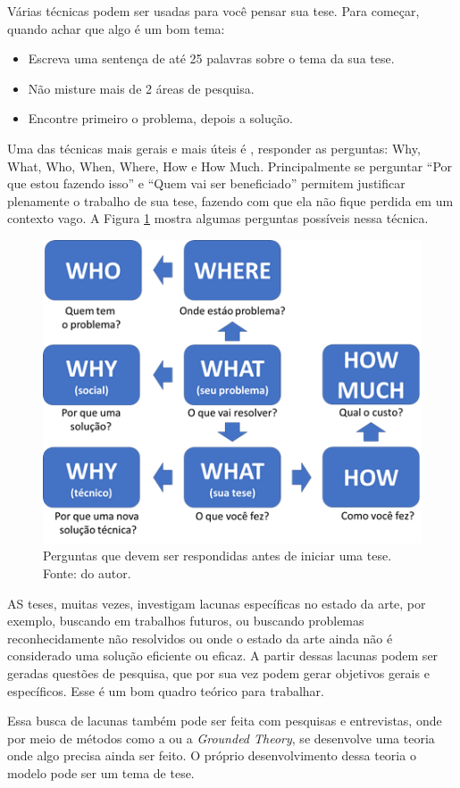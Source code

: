 Várias técnicas podem ser usadas para você pensar sua tese.
Para começar, quando achar que algo é um bom tema:
\begin{itemize}
    \item Escreva uma sentença de até 25 palavras sobre o tema da sua tese.
    \item Não misture mais de 2 áreas de pesquisa.
    \item Encontre primeiro o problema, depois a solução.
\end{itemize}

 Uma das técnicas mais gerais e mais úteis é , responder as perguntas: Why, What, Who, When, Where, How e How Much. 
Principalmente se perguntar “Por que estou fazendo isso” e “Quem vai ser beneficiado” permitem justificar plenamente o trabalho de sua tese, fazendo com que ela não fique perdida em um contexto vago. 
A Figura \ref{fig:5w2h} mostra algumas perguntas possíveis nessa técnica.

\begin{figure}[hbt]
    \centering
    \includegraphics[width=0.7\linewidth]{Images/5w2h}
    \caption{Perguntas que devem ser respondidas antes de iniciar uma tese. Fonte: do autor.}
    \label{fig:5w2h}
\end{figure}

AS teses, muitas vezes, investigam lacunas específicas no estado da arte, por exemplo, buscando em trabalhos futuros, ou buscando problemas reconhecidamente não resolvidos ou onde o estado da arte ainda não é considerado uma solução eficiente ou eficaz. 
A partir dessas lacunas podem ser geradas questões de pesquisa, que por sua vez podem gerar objetivos gerais e específicos. Esse é um bom quadro teórico para trabalhar.

Essa busca de lacunas também pode ser feita com pesquisas e entrevistas, onde por meio de métodos como a \citep{bardin2011analise} ou a \textit{Grounded Theory}\citep{glaser1967discovery}, se desenvolve uma teoria onde algo precisa ainda ser feito. O próprio desenvolvimento dessa teoria o modelo pode ser um tema de tese.

